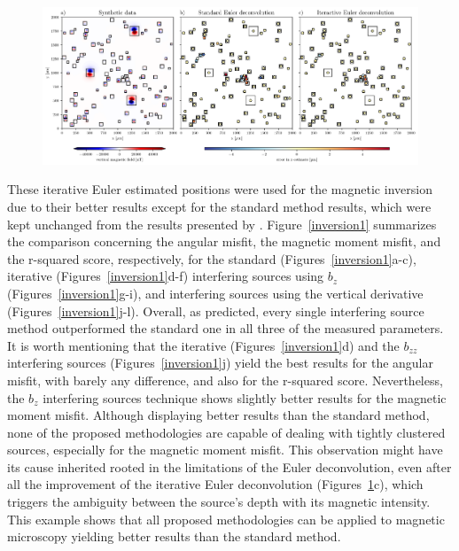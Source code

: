 \begin{figure}[tb!]
  \centering
  \includegraphics[width=1\linewidth]{figures/euler-comparion-1.png}
  \caption{
      }
  \label{euler1}
\end{figure}

These iterative Euler estimated positions were used for the magnetic inversion due to their better results except for the standard method results, which were kept unchanged from the results presented by \citet{Souza-Junior2023b}. Figure~\ref{inversion1} summarizes the comparison concerning the angular misfit, the magnetic moment misfit, and the r-squared score, respectively, for the standard (Figures~\ref{inversion1}a-c), iterative (Figures~\ref{inversion1}d-f) interfering sources using $b_z$ (Figures~\ref{inversion1}g-i), and interfering sources using the vertical derivative (Figures~\ref{inversion1}j-l). Overall, as predicted, every single interfering source method outperformed the standard one in all three of the measured parameters. It is worth mentioning that the iterative (Figures~\ref{inversion1}d) and the $b_{zz}$ interfering sources (Figures~\ref{inversion1}j) yield the best results for the angular misfit, with barely any difference, and also for the r-squared score. Nevertheless, the $b_{z}$ interfering sources technique shows slightly better results for the magnetic moment misfit. Although displaying better results than the standard method, none of the proposed methodologies are capable of dealing with tightly clustered sources, especially for the magnetic moment misfit. This observation might have its cause inherited rooted in the limitations of the Euler deconvolution, even after all the improvement of the iterative Euler deconvolution (Figures~\ref{euler1}c), which triggers the ambiguity between the source's depth with its magnetic intensity. This example shows that all proposed methodologies can be applied to magnetic microscopy yielding better results than the standard method.



